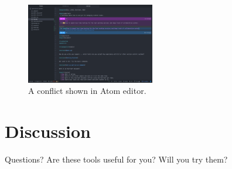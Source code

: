 \documentclass[fleqn,10pt]{wlscirep}
\begin{document}
\begin{figure}[ht]
\caption{A conflict shown in Atom editor.}
\centering
\includegraphics[width=0.5\textwidth]{atom-conflict}
\end{figure}

\pagebreak

\section*{Discussion}

Questions? Are these tools useful for you? Will you try them?
\end{document}
